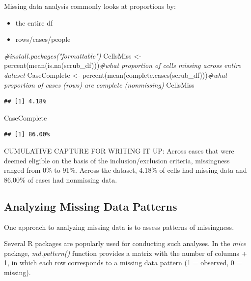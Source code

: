 \documentclass[
  11pt,
]{book}
\newenvironment{Shaded}{\begin{snugshade}}{\end{snugshade}}
\newcommand{\CommentTok}[1]{\textcolor[rgb]{0.56,0.35,0.01}{\textit{#1}}}
\newcommand{\FunctionTok}[1]{\textcolor[rgb]{0.00,0.00,0.00}{#1}}
\newcommand{\NormalTok}[1]{#1}
\newcommand{\OtherTok}[1]{\textcolor[rgb]{0.56,0.35,0.01}{#1}}
\providecommand{\tightlist}{%
  \setlength{\itemsep}{0pt}\setlength{\parskip}{0pt}}
\begin{document}
Missing data analysis commonly looks at proportions by:

\begin{itemize}
\tightlist
\item
  the entire df
\item
  rows/cases/people
\end{itemize}

\begin{Shaded}
\begin{Highlighting}[]
\CommentTok{\#install.packages("formattable")}
\NormalTok{CellsMiss }\OtherTok{\textless{}{-}} \FunctionTok{percent}\NormalTok{(}\FunctionTok{mean}\NormalTok{(}\FunctionTok{is.na}\NormalTok{(scrub\_df)))}\CommentTok{\#what proportion of cells missing across entire dataset}
\NormalTok{CaseComplete }\OtherTok{\textless{}{-}} \FunctionTok{percent}\NormalTok{(}\FunctionTok{mean}\NormalTok{(}\FunctionTok{complete.cases}\NormalTok{(scrub\_df)))}\CommentTok{\#what proportion of cases (rows) are complete (nonmissing)}
\NormalTok{CellsMiss}
\end{Highlighting}
\end{Shaded}

\begin{verbatim}
## [1] 4.18%
\end{verbatim}

\begin{Shaded}
\begin{Highlighting}[]
\NormalTok{CaseComplete}
\end{Highlighting}
\end{Shaded}

\begin{verbatim}
## [1] 86.00%
\end{verbatim}

CUMULATIVE CAPTURE FOR WRITING IT UP: Across cases that were deemed eligible on the basis of the inclusion/exclusion criteria, missingness ranged from 0\% to 91\%. Across the dataset, 4.18\% of cells had missing data and 86.00\% of cases had nonmissing data.

\hypertarget{analyzing-missing-data-patterns}{%
\subsection{Analyzing Missing Data Patterns}\label{analyzing-missing-data-patterns}}

One approach to analyzing missing data is to assess patterns of missingness.

Several R packages are popularly used for conducting such analyses. In the \emph{mice} package, \emph{md.pattern()} function provides a matrix with the number of columns + 1, in which each row corresponds to a missing data pattern (1 = observed, 0 = missing).
\end{document}
